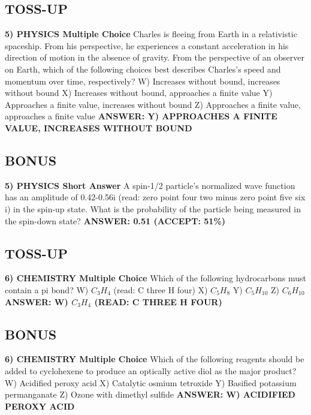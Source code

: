 \documentclass{article}
\begin{document}
\subsection*{TOSS-UP}
\textbf{5) PHYSICS Multiple Choice} Charles is fleeing from Earth in a relativistic spaceship. From his perspective, he experiences a constant acceleration in his direction of motion in the absence of gravity. From the perspective of an observer on Earth, which of the following choices best describes Charles's speed and momentum over time, respectively?
\newline
W) Increases without bound, increases without bound
\newline
X) Increases without bound, approaches a finite value
\newline
Y) Approaches a finite value, increases without bound
\newline
Z) Approaches a finite value, approaches a finite value
\newline
\textbf{ANSWER: Y) APPROACHES A FINITE VALUE, INCREASES WITHOUT BOUND}

\subsection*{BONUS}
\textbf{5) PHYSICS Short Answer} A spin-1/2 particle's normalized wave function has an amplitude of 0.42-0.56i (read: zero point four two minus zero point five six i) in the spin-up state. What is the probability of the particle being measured in the spin-down state?
\newline
\textbf{ANSWER: 0.51 (ACCEPT: 51\%)}

\subsection*{TOSS-UP}
\textbf{6) CHEMISTRY Multiple Choice} Which of the following hydrocarbons must contain a pi bond?
\newline
W) $C_{3}H_{4}$ (read: C three H four)
\newline
X) $C_{5}H_{8}$
\newline
Y) $C_{5}H_{10}$
\newline
Z) $C_{6}H_{10}$
\newline
\textbf{ANSWER: W) $C_{3}H_{4}$ (READ: C THREE H FOUR)}

\subsection*{BONUS}
\textbf{6) CHEMISTRY Multiple Choice} Which of the following reagents should be added to cyclohexene to produce an optically active diol as the major product?
\newline
W) Acidified peroxy acid
\newline
X) Catalytic osmium tetroxide
\newline
Y) Basified potassium permanganate
\newline
Z) Ozone with dimethyl sulfide
\newline
\textbf{ANSWER: W) ACIDIFIED PEROXY ACID}
\end{document}
